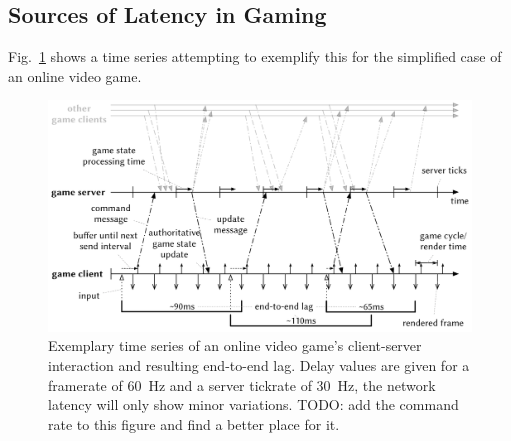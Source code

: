 \subsection{Sources of Latency in Gaming}
\label{sec:latency}


Fig.~\ref{fig:tickrate-timeseries} shows a time series attempting to exemplify this for the simplified case of an online video game.

\begin{figure}[!t]
	\centering
	\includegraphics[width=1.0\columnwidth]{../models/tickrate-timeseries.pdf}
	\caption{Exemplary time series of an online video game's client-server interaction and resulting end-to-end lag. Delay values are given for a framerate of \SI{60}{\hertz} and a server tickrate of \SI{30}{\hertz}, the network latency will only show minor variations. TODO: add the command rate to this figure and find a better place for it.}
\label{fig:tickrate-timeseries}
\end{figure}








